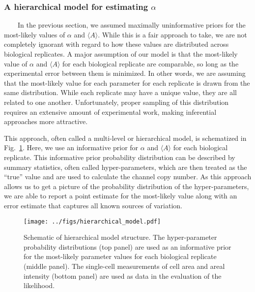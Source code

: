 \subsubsection{\texorpdfstring{A
hierarchical
model
for
estimating
\(\alpha\)}{A hierarchical model for estimating \textbackslash{}alpha}}\label{a-hierarchical-model-for-estimating-alpha}

~~~~In
the
previous
section,
we
assumed
maximally
uninformative
priors
for
the
most-likely
values
of
\(\alpha\)
and
\(\langle A \rangle\).
While
this
is a
fair
approach
to
take,
we are
not
completely
ignorant
with
regard
to how
these
values
are
distributed
across
biological
replicates.
A
major
assumption
of our
model
is
that
the
most-likely
value
of
\(\alpha\)
and
\(\langle A \rangle\)
for
each
biological
replicate
are
comparable,
so
long
as the
experimental
error
between
them
is
minimized.
In
other
words,
we are
assuming
that
the
most-likely
value
for
each
parameter
for
each
replicate
is
drawn
from
the
same
distribution.
While
each
replicate
may
have a
unique
value,
they
are
all
related
to one
another.
Unfortunately,
proper
sampling
of
this
distribution
requires
an
extensive
amount
of
experimental
work,
making
inferential
approaches
more
attractive.

This
approach,
often
called
a
multi-level
or
hierarchical
model,
is
schematized
in
Fig.~\ref{fig:hierarchical_model}.
Here,
we use
an
informative
prior
for
\(\alpha\)
and
\(\langle A \rangle\)
for
each
biological
replicate.
This
informative
prior
probability
distribution
can be
described
by
summary
statistics,
often
called
hyper-parameters,
which
are
then
treated
as the
``true''
value
and
are
used
to
calculate
the
channel
copy
number.
As
this
approach
allows
us to
get a
picture
of the
probability
distribution
of the
hyper-parameters,
we are
able
to
report
a
point
estimate
for
the
most-likely
value
along
with
an
error
estimate
that
captures
all
known
sources
of
variation.

\begin{figure}
\centering
\texttt{[image: ../figs/hierarchical\_model.pdf]}
\caption{Schematic
of
hierarchical
model
structure.
The
hyper-parameter
probability
distributions
(top
panel)
are
used
as an
informative
prior
for
the
most-likely
parameter
values
for
each
biological
replicate
(middle
panel).
The
single-cell
measurements
of
cell
area
and
areal
intensity
(bottom
panel)
are
used
as
data
in the
evaluation
of the
likelihood.}\label{fig:hierarchical_model}
\end{figure}

